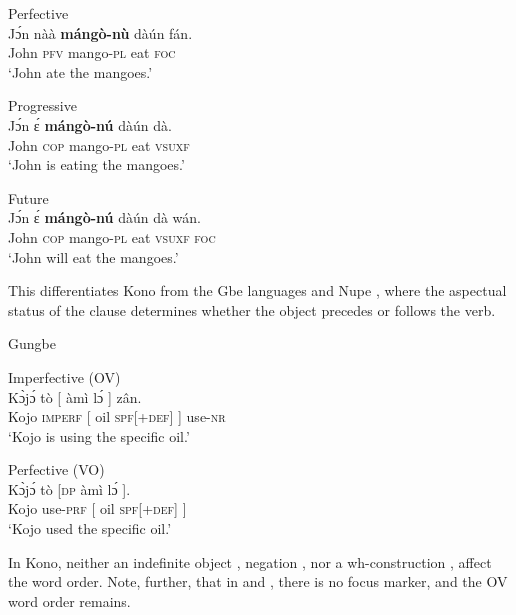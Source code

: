 \documentclass[output=paper,colorlinks,citecolor=brown,draftmode
]{langscibook}
\begin{document}
\ea \label{ex:Kono:3 Tenses}
\begin{xlist}

\ex \label{ex:Kono:Perfective}
Perfective \\
\gll Jɔ́n nàà \textbf{mángò-nù} dàún fán. \\
John \textsc{pfv} mango-\textsc{pl} eat \textsc{foc} \\
\glt `John ate the mangoes.'

\ex \label{ex:Kono:Progressive}
Progressive \\
\gll Jɔ́n ɛ́ \textbf{mángò-nú} dàún dà. \\
John \textsc{cop} mango-\textsc{pl} eat \textsc{vsuxf} \\
\glt `John is eating the mangoes.'

\ex \label{ex:Kono:Future}
Future \\
\gll Jɔ́n ɛ́ \textbf{mángò-nú} dàún dà wán. \\
John \textsc{cop} mango-\textsc{pl} eat \textsc{vsuxf} \textsc{foc}\\
\glt `John will eat the mangoes.'

\end{xlist}
\z 

This differentiates Kono from the Gbe languages \citet{aboh2004morphosyntax} and Nupe \citet{kandybowicz2003directionality}, where the aspectual status of the clause determines whether the object precedes or follows the verb. 


\ea \label{ex:Gungbe}
Gungbe \citep[192]{aboh2004morphosyntax}
\begin{xlist}

\ex \label{ex:Gungbe:imperfective}
Imperfective (OV) \\
\gll Kɔ̀jɔ́ tò [ 	àmì	lɔ́ ] zân.	 \\
Kojo \textsc{imperf} [{} oil \textsc{spf[+def]} ] use-\textsc{nr} \\
\glt `Kojo is using the specific oil.'

\ex \label{ex:Gungbe:perfective}
Perfective (VO) \\
\gll Kɔ̀jɔ́ tò [\textsc{dp} 	àmì	lɔ́ ].  \\
Kojo use-\textsc{prf}  [{} oil \textsc{spf[+def]} ]  \\
\glt `Kojo used the specific oil.'

\end{xlist}
\z 

In Kono, neither an indefinite object , negation , nor a wh-construc\-tion , affect the word order. Note, further, that in  and , there is no focus marker, and the OV word order remains.
\end{document}
